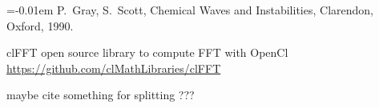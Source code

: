 \documentclass{sig-alternate-05-2015}
\begin{document}
%

\begin{thebibliography}{1}\itemsep=-0.01em
  \setlength{\baselineskip}{1.0em}
P.~Gray, S.~Scott, Chemical Waves and Instabilities, Clarendon, Oxford, 1990.

  clFFT open source library to compute FFT with OpenCl\\
  \url{https://github.com/clMathLibraries/clFFT}
  
 maybe cite something for splitting ???
\end{thebibliography}
%
%

\end{document}
